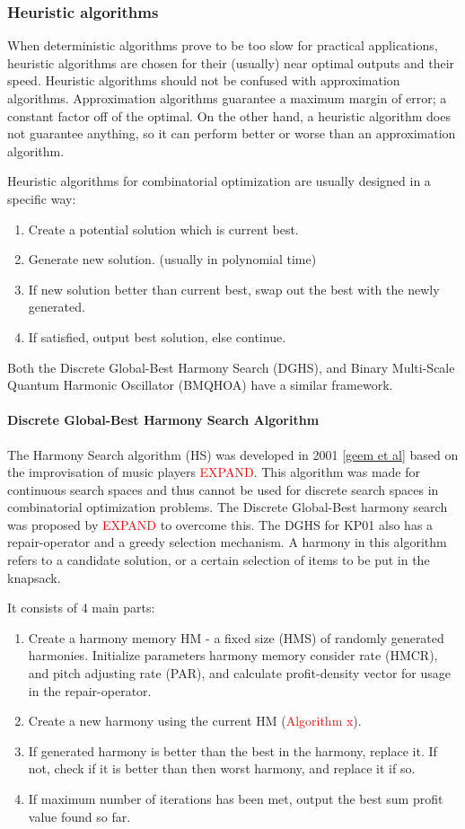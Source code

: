 \documentclass[titlepage]{article}
\begin{document}
\subsubsection*{Heuristic algorithms}
When deterministic algorithms prove to be too slow for practical applications, heuristic algorithms are chosen for their (usually) near optimal outputs and their speed. Heuristic algorithms should not be confused with approximation algorithms. Approximation algorithms guarantee a maximum margin of error; a constant factor off of the optimal. On the other hand, a heuristic algorithm does not guarantee anything, so it can perform better or worse than an approximation algorithm. 

Heuristic algorithms for combinatorial optimization are usually designed in a specific way:
\begin{enumerate}
    \item Create a potential solution which is current best.
    \item Generate new solution. (usually in polynomial time) 
    \item If new solution better than current best, swap out the best with the newly generated. 
    \item If satisfied, output best solution, else continue.
\end{enumerate}

Both the Discrete Global-Best Harmony Search (DGHS), and Binary Multi-Scale Quantum Harmonic Oscillator (BMQHOA) have a similar framework.

\paragraph*{Discrete Global-Best Harmony Search Algorithm}
The Harmony Search algorithm (HS) was developed in 2001 \ref{geem et al} based on the improvisation of music players \textcolor{red}{EXPAND}. This algorithm was made for continuous search spaces and thus cannot be used for discrete search spaces in combinatorial optimization problems. The Discrete Global-Best harmony search was proposed by \textcolor{red}{EXPAND} to overcome this. The DGHS for KP01 also has a repair-operator and a greedy selection mechanism. A harmony in this algorithm refers to a candidate solution, or a certain selection of items to be put in the knapsack. 

It consists of 4 main parts:
\begin{enumerate}
    \item Create a harmony memory HM - a fixed size (HMS) of randomly generated harmonies. Initialize parameters harmony memory consider rate (HMCR), and pitch adjusting rate (PAR), and calculate profit-density vector for usage in the repair-operator.
    \item Create a new harmony using the current HM (\textcolor{red}{Algorithm x}).
    \item If generated harmony is better than the best in the harmony, replace it. If not, check if it is better than then worst harmony, and replace it if so. 
    \item If maximum number of iterations has been met, output the best sum profit value found so far.
\end{enumerate}
\end{document}
